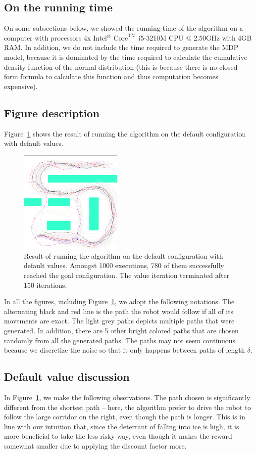 \documentclass[a4paper]{article}
\begin{document}
\subsection{On the running time}
On some subsections below, we showed the running time of the algorithm on
a computer with processors 4x Intel$^\text{\textregistered}$ $\text{Core}^{\text{TM}}$ i5-3210M CPU @ 2.50GHz with 4GB RAM. In addition, we do not
include the time required to generate the MDP model, because it is dominated
by the time required to calculate the cumulative density function of the
normal distribution (this is because there is no closed form formula to
calculate this function and thus computation becomes expensive).

\subsection{Figure description}
Figure~\ref{f:b} shows the result of running the algorithm on the default
configuration with default values.

\begin{figure}
\caption{Result of running the algorithm on the default configuration with default values.
Amongst 1000 executions, 780 of them successfully reached the goal configuration.
The value iteration terminated after 150 iterations.}
\label{f:b}
\centerline{\includegraphics[width=5cm]{b.png}}
\end{figure}

In all the figures, including Figure~\ref{f:b}, we adopt the following notations.
The alternating black and red line is the path the robot would follow if
all of its movements are exact. The light grey paths depicts multiple paths
that were generated. In addition, there are 5 other bright colored paths that
are chosen randomly from all the generated paths. The paths may not seem continuous
because we discretize the noise so that it only happens between paths of length
$\delta$.

\subsection{Default value discussion}
In Figure~\ref{f:b}, we make the following observations. The path chosen is
significantly different from the shortest path -- here, the algorithm prefer
to drive the robot to follow the large corridor on the right, even though
the path is longer. This is in line with our intuition that, since the deterrant
of falling into ice is high, it is more beneficial to take the less risky way,
even though it makes the reward somewhat smaller due to applying the discount
factor more.
\end{document}
